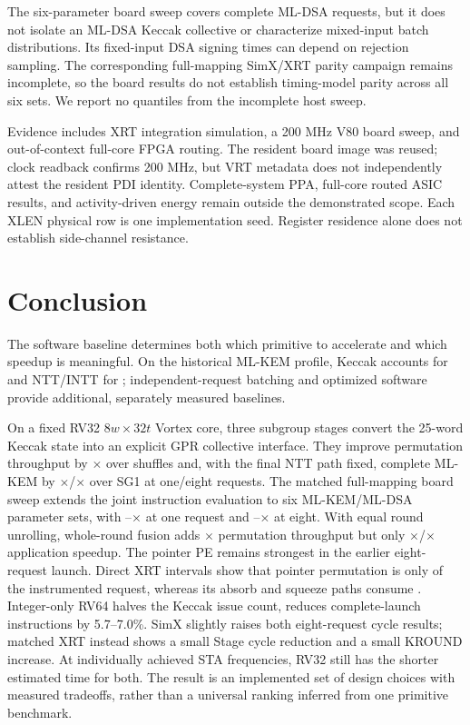 \documentclass[conference,letterpaper]{IEEEtran}
\begin{document}
The six-parameter board sweep covers complete ML-DSA requests, but it does
not isolate an ML-DSA Keccak collective or characterize mixed-input batch
distributions. Its fixed-input DSA signing times can depend on rejection
sampling. The corresponding full-mapping SimX/XRT parity campaign remains
incomplete, so the board results do not establish timing-model parity across
all six sets. We report no quantiles from the incomplete host sweep.

Evidence includes XRT integration simulation, a 200 MHz V80 board sweep, and
out-of-context full-core FPGA routing. The resident board image was reused;
clock readback confirms 200 MHz, but VRT metadata does not independently
attest the resident PDI identity. Complete-system PPA, full-core routed ASIC
results, and activity-driven energy remain outside the demonstrated scope.
Each XLEN physical row is one implementation seed.
Register residence alone does not establish side-channel resistance.

\section{Conclusion}
The software baseline determines both which primitive to accelerate and
which speedup is meaningful. On the historical ML-KEM profile, Keccak
accounts for \MlkKeccakShare{} and NTT/INTT for \MlkNttShare{};
independent-request batching and optimized software provide additional,
separately measured baselines.

On a fixed RV32 $8w\times32t$ Vortex core, three subgroup stages convert
the 25-word Keccak state into an explicit GPR collective interface.
They improve permutation throughput by \StageThroughputGain{}$\times$
over shuffles and, with the final NTT path fixed, complete ML-KEM by
\UnifiedStageOne{}$\times$/\UnifiedStageEight{}$\times$ over SG1 at
one/eight requests.
The matched full-mapping board sweep extends the joint instruction evaluation
to six ML-KEM/ML-DSA parameter sets, with \BoardMinOne{}--\BoardMaxOne{}$\times$
at one request and \BoardMinEight{}--\BoardMaxEight{}$\times$ at eight.
With equal round unrolling, whole-round fusion adds
\MatchedRoundGainEight{}$\times$ permutation throughput but only
\MatchedRoundKemGainOne{}$\times$/\MatchedRoundKemGainEight{}$\times$
application speedup. The pointer PE remains strongest in the earlier
eight-request launch. Direct XRT intervals show that pointer permutation is
only \DirectPointerPermuteShare{} of the instrumented request, whereas its
absorb and squeeze paths consume \DirectPointerSpongeShare{}. Integer-only
RV64 halves the Keccak issue count, reduces
complete-launch instructions by 5.7--7.0\%. SimX slightly raises both
eight-request cycle results; matched XRT instead shows a small Stage cycle
reduction and a small KROUND increase. At individually achieved STA
frequencies, RV32 still has the shorter estimated time for both.
The result is an implemented set of design choices
with measured tradeoffs, rather than a universal ranking inferred from
one primitive benchmark.
\end{document}
